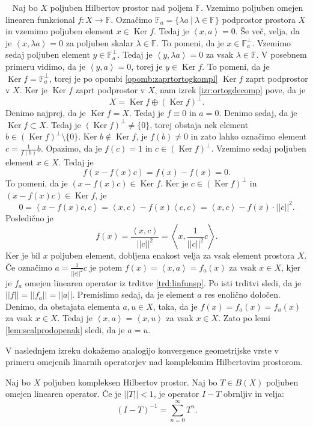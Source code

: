 \documentclass[12pt,a4paper,oneside,fleqn,openany]{book}
\newcommand{\eopf}{\raisebox{0.8ex}{\framebox{}}} %
\newenvironment{dokaz}%
{\noindent{\bf Dokaz.}\ }%
{\hfill\eopf\par\bigskip}%
\newcommand{\F}{\mathbb{F}}
\newcommand{\abs}[1]{\ensuremath{\lvert #1 \rvert}}
\newcommand{\norm}[1]{\abs{\abs{#1}}}
\newcommand{\Sp}[2]{\ensuremath{\left<#1, #2\right>}}
\newcommand{\map}[3]{\ensuremath{{#1}:{#2}\rightarrow{#3}}}
\begin{document}
\begin{dokaz}
	Naj bo $X$ poljuben Hilbertov prostor nad poljem $\F$. Vzemimo poljuben omejen linearen funkcional $\map{f}{X}{\F}$. Označimo $\F_a = \{\lambda a~|~\lambda\in\F\}$ podprostor prostora $X$ in vzemimo poljuben element $x\in \operatorname{Ker}f$. Tedaj je $\Sp{x}{a}=0$. Še več, velja, da je $\Sp{x}{\lambda a}=0$ za poljuben skalar $\lambda\in\F$. To pomeni, da je $x\in \F_a^\bot$. Vzemimo sedaj poljuben element $y\in \F_a^\bot$. Tedaj je $\Sp{y}{\lambda a}= 0$ za vsak $\lambda\in\F$. V posebnem primeru vidimo, da je $\Sp{y}{a}=0$, torej je $y\in\operatorname{Ker}f$. To pomeni, da je $\operatorname{Ker}f = \F_a^\bot$, torej je po opombi \ref{opomb:zaprtortogkompl} $\operatorname{Ker}f$ zaprt podprostor v $X$. Ker je $\operatorname{Ker}f$ zaprt podprostor v $X$, nam izrek \ref{izr:ortogdecomp} pove, da je $$X=\operatorname{Ker}f \oplus (\operatorname{Ker}f)^\bot.$$ Denimo najprej, da je $\operatorname{Ker}f = X$. Tedaj je $f\equiv 0$ in $a=0$. Denimo sedaj, da je $\operatorname{Ker}f \subset X$. Tedaj je $(\operatorname{Ker}f)^\bot\neq \{0\}$, torej obstaja nek element $b\in (\operatorname{Ker}f)^\bot\setminus\{0\}$. Ker $b\notin \operatorname{Ker}f$, je $f(b)\neq 0$ in zato lahko označimo element $c = \frac{1}{f(b)}b$. Opazimo, da je $ f(c)=1$ in $c\in(\operatorname{Ker}f)^\bot$. Vzemimo sedaj poljuben element $x\in X$. Tedaj je $$f(x-f(x)c)= f(x) - f(x) = 0.$$ To pomeni, da je $(x-f(x)c) \in \operatorname{Ker}f$. Ker je $c\in(\operatorname{Ker}f)^\bot$ in $(x-f(x)c) \in \operatorname{Ker}f$, je $$0=\Sp{x - f(x)c}{c}=\Sp{x}{c} - f(x)\Sp{c}{c} = \Sp{x}{c} - f(x)\cdot\norm{c}^2.$$ Posledično je $$f(x) = \frac{\Sp{x}{c}}{\norm{c}^2}=\Sp{x}{\frac{1}{\norm{c}^2}c}.$$ Ker je bil $x$ poljuben element, dobljena enakost velja za vsak element prostora $X$. Če označimo $a = \frac{1}{\norm{c}^2}c$ je potem $f(x)=\Sp{x}{a}=f_a(x)$ za vsak $x\in X$, kjer je $f_a$ omejen linearen operator iz trditve \ref{trd:linfunsp}. Po isti trditvi sledi, da je $\norm{f}=\norm{f_a}=\norm{a}$. Premislimo sedaj, da je element $a$ res enolično določen. Denimo, da obstajata elementa $a, u\in X$, taka, da je $f(x) = f_a(x)=f_u(x)$ za vsak $x\in X$. Tedaj je $\Sp{x}{a}=\Sp{x}{u}$ za vsak $x\in X$. Zato po lemi \ref{lem:scalprodopenak} sledi, da je $a=u$.
\end{dokaz}
V naslednjem izreku dokažemo analogijo konvergence geometrijske vrste v primeru omejenih linarnih operatorjev nad kompleksnim Hilbertovim prostorom.
\begin{izrek}
	\label{izr:Hilbertopinv}
	Naj bo $X$ poljuben kompleksen Hilbertov prostor. Naj bo $T\in B(X)$ poljuben omejen linearen operator. Če je $\norm{T}< 1$, je operator $I-T$ obrnljiv in velja: $$(I-T)^{-1} = \sum_{n = 0}^{\infty}T^n.$$
\end{izrek}
\end{document}
